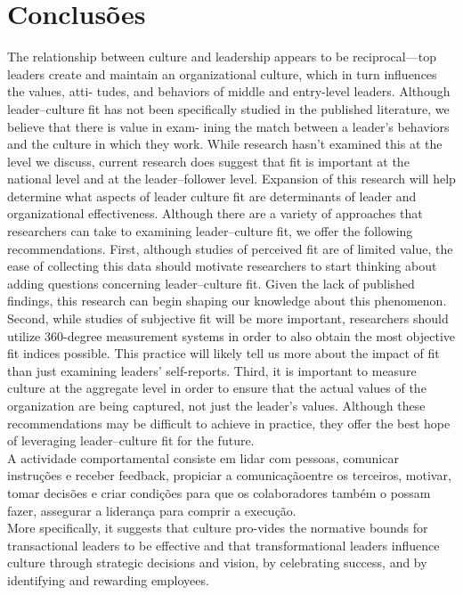 \section{Conclusões}
The relationship between culture and leadership appears to be reciprocal—top leaders create and maintain an organizational culture, which in turn influences the values, atti- tudes, and behaviors of middle and entry-level leaders. Although leader–culture fit has not been specifically studied in the published literature, we believe that there is value in exam- ining the match between a leader’s behaviors and the culture in which they work. While research hasn’t examined this at the level we discuss, current research does suggest that fit is important at the national level and at the leader–follower level. Expansion of this research will help determine what aspects of leader culture fit are determinants of leader and organizational effectiveness. Although there are a variety of approaches that researchers can take to examining leader–culture fit, we offer the following recommendations. First, although studies of perceived fit are of limited value, the ease of collecting this data should motivate researchers to start thinking about adding questions concerning leader–culture fit. Given the lack of published findings, this research can begin shaping our knowledge about this phenomenon. Second, while studies of subjective fit will be more important, researchers should utilize 360-degree measurement systems in order to also obtain the most objective fit indices possible. This practice will likely tell us more about the impact of fit than just examining leaders’ self-reports. Third, it is important to measure culture at the aggregate level in order to ensure that the actual values of the organization are being captured, not just the leader’s values. Although these recommendations may be difficult to achieve in practice, they offer the best hope of leveraging leader–culture fit for the future.\\

A actividade comportamental consiste em lidar com pessoas, comunicar instruções e receber feedback, propiciar a comunicaçãoentre os terceiros, motivar, tomar decisões e criar condições para que os colaboradores também o possam fazer, assegurar a liderança para comprir a execução.\\


More specifically, it suggests that culture pro-vides the normative bounds for transactional leaders to be effective and that transformational leaders influence culture through strategic decisions  and vision, by celebrating success, and by identifying and rewarding employees. \\

